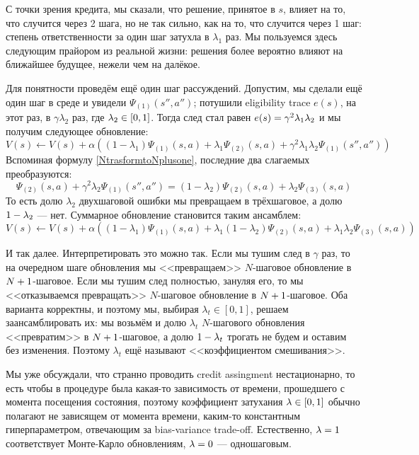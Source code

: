 С точки зрения кредита, мы сказали, что решение, принятое в $s$, влияет на то, что случится через 2 шага, но не так сильно, как на то, что случится через 1 шаг: степень ответственности за один шаг затухла в $\lambda_1$ раз. Мы пользуемся здесь следующим прайором из реальной жизни: решения более вероятно влияют на ближайшее будущее, нежели чем на далёкое.

Для понятности проведём ещё один шаг рассуждений. Допустим, мы сделали ещё один шаг в среде и увидели $\Psi_{(1)}(s'', a'')$; потушили eligibility trace $e(s)$, на этот раз, в $\gamma \lambda_2$ раз, где $\lambda_2 \HM \in [0, 1]$. Тогда след стал равен $e(s) \HM= \gamma^2 \lambda_1 \lambda_2$ и мы получим следующее обновление:
$$V(s) \leftarrow V(s) + \alpha \left( (1 - \lambda_1) \Psi_{(1)}(s, a) + \lambda_1 \Psi_{(2)}(s, a) + \gamma^2 \lambda_1 \lambda_2 \Psi_{(1)}(s'', a'') \right)$$
Вспоминая формулу \eqref{NtrasformtoNplusone}, последние два слагаемых преобразуются:
$$\Psi_{(2)}(s, a) + \gamma^2 \lambda_2 \Psi_{(1)}(s'', a'') = (1 - \lambda_2) \Psi_{(2)}(s, a) + \lambda_2 \Psi_{(3)}(s, a)$$
То есть долю $\lambda_2$ двухшаговой ошибки мы превращаем в трёхшаговое, а долю $1 \HM- \lambda_2$ --- нет. Суммарное обновление становится таким ансамблем:
$$V(s) \leftarrow V(s) + \alpha \left( (1 - \lambda_1) \Psi_{(1)}(s, a) + \lambda_1 (1 - \lambda_2) \Psi_{(2)}(s, a) + \lambda_1 \lambda_2 \Psi_{(3)}(s, a) \right)$$

И так далее. Интерпретировать это можно так. Если мы тушим след в $\gamma$ раз, то на очередном шаге обновления мы <<превращаем>> $N$-шаговое обновление в $N \HM+ 1$-шаговое. Если мы тушим след полностью, зануляя его, то мы <<отказываемся превращать>> $N$-шаговое обновление в $N \HM+ 1$-шаговое. Оба варианта корректны, и поэтому мы, выбирая $\lambda_t \in [0, 1]$, решаем заансамблировать их: мы возьмём и долю $\lambda_t$ $N$-шагового обновления <<превратим>> в $N \HM+ 1$-шаговое, а долю $1 \HM- \lambda_t$ трогать не будем и оставим без изменения. Поэтому $\lambda_t$ ещё называют <<коэффициентом смешивания>>.

Мы уже обсуждали, что странно проводить credit assingment нестационарно, то есть чтобы в процедуре была какая-то зависимость от времени, прошедшего с момента посещения состояния, поэтому коэффициент затухания $\lambda \HM\in [0, 1]$ обычно полагают не зависящем от момента времени, каким-то константным гиперпараметром, отвечающим за bias-variance trade-off. Естественно, $\lambda \HM= 1$ соответствует Монте-Карло обновлениям, $\lambda \HM= 0$ --- одношаговым.

